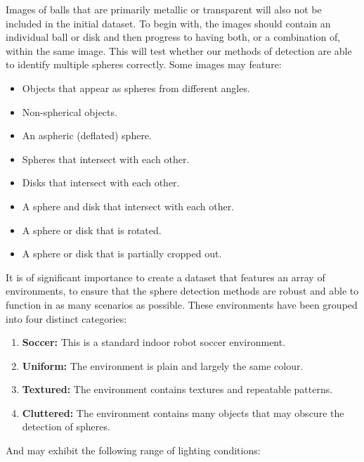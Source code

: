 \documentclass[11pt]{scrartcl}
\begin{document}
{{            Images of balls that are primarily metallic or
            transparent will also not be included in the initial dataset. To begin with, the images
            should contain an individual ball or disk and then progress to
            having both, or a combination of, within the same image. This will
            test whether our methods of detection are able to identify
            multiple spheres correctly. Some images may feature:

        	\begin{itemize}
        		\item Objects that appear as spheres from different angles.
        		\item Non-spherical objects.
        		\item An aspheric (deflated) sphere.
        		\item Spheres that intersect with each other.
        		\item Disks that intersect with each other.
        		\item A sphere and disk that intersect with each other.
        		\item A sphere or disk that is rotated.
        		\item A sphere or disk that is partially cropped out.
        	\end{itemize}

        	It is of significant importance to create a dataset that features an
        	array of environments, to ensure that the sphere detection methods are
        	robust and able to function in as many scenarios as possible. These
        	environments have been grouped into four distinct categories:

        	\begin{enumerate}
        		\item \textbf{Soccer:} This is a standard indoor robot soccer 
        		environment.
        		\item \textbf{Uniform:} The environment is plain and largely the same
        		colour.
        		\item \textbf{Textured:} The environment contains textures and
        		repeatable patterns.
        		\item \textbf{Cluttered:} The environment contains many objects that
        		may obscure the detection of spheres.
        	\end{enumerate}
        	
        	And may exhibit the following range of lighting conditions:

}}
\end{document}
